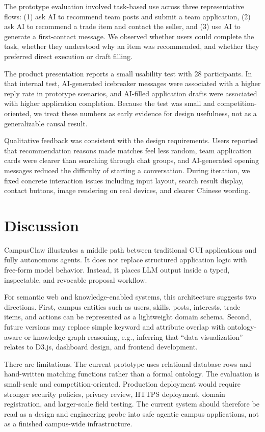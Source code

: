 \documentclass[twocolumn]{article}
\begin{document}
The prototype evaluation involved task-based use across three representative flows: (1) ask AI to recommend team posts and submit a team application, (2) ask AI to recommend a trade item and contact the seller, and (3) use AI to generate a first-contact message. We observed whether users could complete the task, whether they understood why an item was recommended, and whether they preferred direct execution or draft filling.

The product presentation reports a small usability test with 28 participants. In that internal test, AI-generated icebreaker messages were associated with a higher reply rate in prototype scenarios, and AI-filled application drafts were associated with higher application completion. Because the test was small and competition-oriented, we treat these numbers as early evidence for design usefulness, not as a generalizable causal result.

Qualitative feedback was consistent with the design requirements. Users reported that recommendation reasons made matches feel less random, team application cards were clearer than searching through chat groups, and AI-generated opening messages reduced the difficulty of starting a conversation. During iteration, we fixed concrete interaction issues including input layout, search result display, contact buttons, image rendering on real devices, and clearer Chinese wording.

\section{Discussion}
CampusClaw illustrates a middle path between traditional GUI applications and fully autonomous agents. It does not replace structured application logic with free-form model behavior. Instead, it places LLM output inside a typed, inspectable, and revocable proposal workflow.

For semantic web and knowledge-enabled systems, this architecture suggests two directions. First, campus entities such as users, skills, posts, interests, trade items, and actions can be represented as a lightweight domain schema. Second, future versions may replace simple keyword and attribute overlap with ontology-aware or knowledge-graph reasoning, e.g., inferring that ``data visualization'' relates to D3.js, dashboard design, and frontend development.

There are limitations. The current prototype uses relational database rows and hand-written matching functions rather than a formal ontology. The evaluation is small-scale and competition-oriented. Production deployment would require stronger security policies, privacy review, HTTPS deployment, domain registration, and larger-scale field testing. The current system should therefore be read as a design and engineering probe into safe agentic campus applications, not as a finished campus-wide infrastructure.
\end{document}
